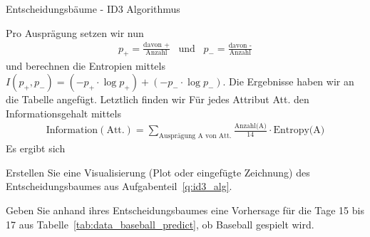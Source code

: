 \begin{task}[credit=16]{Entscheidungsbäume - ID3 Algorithmus}
\begin{subtask}[points=10,title=ID3 Algorithmus]
\begin{solution}
\begin{table}[h!]
\end{table}
\newline
Pro Ausprägung setzen wir nun
\begin{align*}
p_+=\frac{\text{davon +}}{\text{Anzahl}}\;\;\; \text{und}\;\;\; p_-=\frac{\text{davon -}}{\text{Anzahl}}
\end{align*}
und berechnen die Entropien mittels $I(p_+,p_-)=(-p_+\cdot\log p_+)+(-p_-\cdot\log p_-)$. Die Ergebnisse haben wir an die Tabelle angefügt. Letztlich finden wir Für jedes Attribut Att. den Informationsgehalt mittels \begin{align*}
\text{Information}(\text{Att.})=\sum_{\text{Ausprägung A von Att.}}\frac{\text{Anzahl(A)}}{14}\cdot\text{Entropy(A)}
\end{align*}
Es ergibt sich
\end{solution}

\end{subtask}

\begin{subtask}[points=3,title=Visualisierung]
Erstellen Sie eine Visualisierung (Plot oder eingefügte Zeichnung) des Entscheidungsbaumes aus Aufgabenteil~\ref{q:id3_alg}.

\begin{solution}
\end{solution}

\end{subtask}

\begin{subtask}[points=3,title=Vorhersage]
Geben Sie anhand ihres Entscheidungsbaumes eine Vorhersage für die Tage 15 bis 17 aus Tabelle~\ref{tab:data_baseball_predict}, ob Baseball gespielt wird.

\begin{solution}
\end{solution}

\end{subtask}
\end{task}
